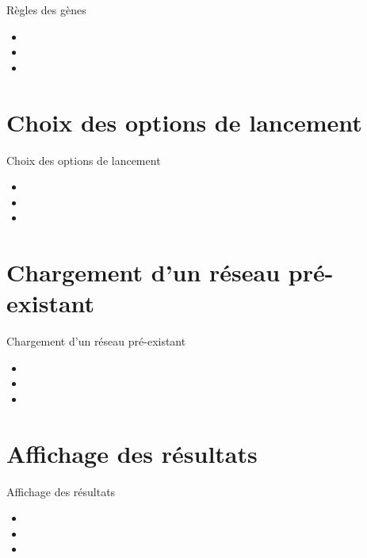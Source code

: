 \documentclass{beamer}
\begin{document}
\begin{frame}{\textcolor{bleu2}{\hspace{1cm}Règles des gènes}}
	\begin{itemize}
	\item 
	\item 
	\item 
	\end{itemize}
\end{frame}

\section{Choix des options de lancement}

\begin{frame}{\textcolor{bleu2}{\hspace{1cm}Choix des options de lancement}}
	\begin{itemize}
	\item 
	\item 
	\item 
	\end{itemize}
\end{frame}

\section{Chargement d'un réseau pré-existant}

\begin{frame}{\textcolor{bleu2}{\hspace{1cm}Chargement d'un réseau pré-existant}}
	\begin{itemize}
	\item 
	\item 
	\item 
	\end{itemize}
\end{frame}

\section{Affichage des résultats}

\begin{frame}{\textcolor{bleu2}{\hspace{1cm}Affichage des résultats}}
	\begin{itemize}
	\item 
	\item 
	\item 
	\end{itemize}
\end{frame}
\end{document}
